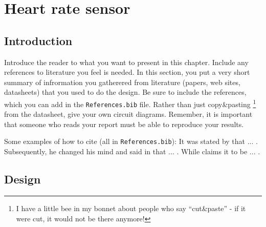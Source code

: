 \chapter{Heart rate sensor}\label{ch:heartRate}

\section{Introduction} \label{sec:heartIntro}


Introduce the reader to what you want to present in this chapter. 
Include any references to literature you feel is needed. 
In this section, you put a very short summary of infrormation you gatherered from literature (papers, web sites, datasheets) that you used to do the design. Be sure to include the references, which you can add in the \texttt{References.bib} file. 
Rather than just copy\&pasting \footnote{I have a little bee in my bonnet about people who say ``cut\&paste'' - if it were cut, it would not be there anymore!} from the datasheet, give your own circuit diagrams. Remember, it is important that someone who reads your report must be able to reproduce your results. 

Some examples of how to cite (all in \texttt{References.bib}): 
It was stated by \cite{Booysen:2013} that ... . Subsequently, he changed his mind and said in  \cite{Gerber:2019} that ... .
While \cite{WebsiteOpAmp} claims it to be ... .


\section{Design} \label{sec:heartDesign}

